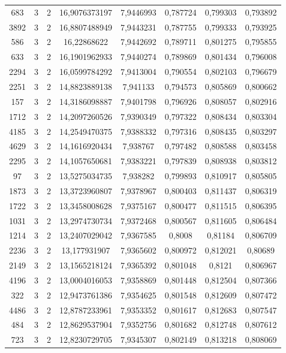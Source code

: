 \begin{longtable}{|c|c|c|c|c|c|c|c|}
683 & 3 & 2 & 16,9076373197 & 7,9446993 & 0,787724 & 0,799303 & 0,793892 \\
3892 & 3 & 2 & 16,8807488949 & 7,9443231 & 0,787755 & 0,799333 & 0,793925 \\
586 & 3 & 2 & 16,22868622 & 7,9442692 & 0,789711 & 0,801275 & 0,795855 \\
633 & 3 & 2 & 16,1901962933 & 7,9440274 & 0,789869 & 0,801434 & 0,796008 \\
2294 & 3 & 2 & 16,0599784292 & 7,9413004 & 0,790554 & 0,802103 & 0,796679 \\
2251 & 3 & 2 & 14,8823889138 & 7,941133 & 0,794573 & 0,805869 & 0,800662 \\
157 & 3 & 2 & 14,3186098887 & 7,9401798 & 0,796926 & 0,808057 & 0,802916 \\
1712 & 3 & 2 & 14,2097260526 & 7,9390349 & 0,797322 & 0,808434 & 0,803304 \\
4185 & 3 & 2 & 14,2549470375 & 7,9388332 & 0,797316 & 0,808435 & 0,803297 \\
4629 & 3 & 2 & 14,1616920434 & 7,938767 & 0,797482 & 0,808588 & 0,803458 \\
2295 & 3 & 2 & 14,1057650681 & 7,9383221 & 0,797839 & 0,808938 & 0,803812 \\
97 & 3 & 2 & 13,5275034735 & 7,938282 & 0,799893 & 0,810917 & 0,805805 \\
1873 & 3 & 2 & 13,3723960807 & 7,9378967 & 0,800403 & 0,811437 & 0,806319 \\
1722 & 3 & 2 & 13,3458008628 & 7,9375167 & 0,800477 & 0,811515 & 0,806395 \\
1031 & 3 & 2 & 13,2974730734 & 7,9372468 & 0,800567 & 0,811605 & 0,806484 \\
1214 & 3 & 2 & 13,2407029042 & 7,9367585 & 0,8008 & 0,81184 & 0,806709 \\
2236 & 3 & 2 & 13,177931907 & 7,9365602 & 0,800972 & 0,812021 & 0,80689 \\
2149 & 3 & 2 & 13,1565218124 & 7,9365392 & 0,801048 & 0,8121 & 0,806967 \\
4196 & 3 & 2 & 13,0004016053 & 7,9358869 & 0,801448 & 0,812504 & 0,807366 \\
322 & 3 & 2 & 12,9473761386 & 7,9354625 & 0,801548 & 0,812609 & 0,807472 \\
4486 & 3 & 2 & 12,8787233961 & 7,9353352 & 0,801617 & 0,812683 & 0,807547 \\
484 & 3 & 2 & 12,8629537904 & 7,9352756 & 0,801682 & 0,812748 & 0,807612 \\
723 & 3 & 2 & 12,8230729705 & 7,9345307 & 0,802149 & 0,813218 & 0,808069 \\

\end{longtable}
